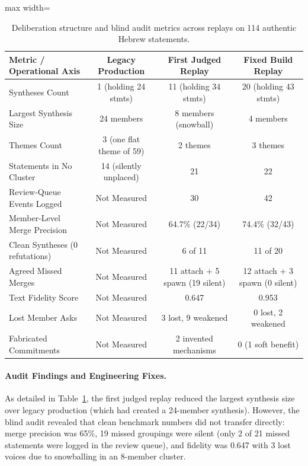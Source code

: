 \documentclass[11pt,a4paper]{article}
\begin{document}
\begin{table}[t]
\centering
\caption{Deliberation structure and blind audit metrics across replays on 114 authentic Hebrew statements.}
\label{tab:realdata}
\footnotesize
\begin{adjustbox}{max width=\textwidth}
\begin{tabular}{@{}lccc@{}}
\toprule
Metric / Operational Axis & Legacy Production & First Judged Replay & Fixed Build Replay \\
\midrule
Syntheses Count & 1 (holding 24 stmts) & 11 (holding 34 stmts) & 20 (holding 43 stmts) \\
Largest Synthesis Size & 24 members & 8 members (snowball) & 4 members \\
Themes Count & 3 (one flat theme of 59) & 2 themes & 3 themes \\
Statements in No Cluster & 14 (silently unplaced) & 21 & 22 \\
Review-Queue Events Logged & Not Measured & 30 & 42 \\
Member-Level Merge Precision & Not Measured & 64.7\% (22/34) & 74.4\% (32/43) \\
Clean Syntheses (0 refutations) & Not Measured & 6 of 11 & 11 of 20 \\
Agreed Missed Merges & Not Measured & 11 attach + 5 spawn (19 silent) & 12 attach + 3 spawn (0 silent) \\
Text Fidelity Score & Not Measured & 0.647 & 0.953 \\
Lost Member Asks & Not Measured & 3 lost, 9 weakened & 0 lost, 2 weakened \\
Fabricated Commitments & Not Measured & 2 invented mechanisms & 0 (1 soft benefit) \\
\bottomrule
\end{tabular}
\end{adjustbox}
\end{table}

\paragraph{Audit Findings and Engineering Fixes.} As detailed in Table~\ref{tab:realdata}, the first judged replay reduced the largest synthesis size over legacy production (which had created a 24-member synthesis). However, the blind audit revealed that clean benchmark numbers did not transfer directly: merge precision was 65\%, 19 missed groupings were silent (only 2 of 21 missed statements were logged in the review queue), and fidelity was 0.647 with 3 lost voices due to snowballing in an 8-member cluster.
\end{document}
